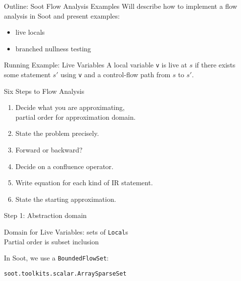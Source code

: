 \begin{slide}{Outline: Soot Flow Analysis Examples}
Will describe how to implement a flow analysis in Soot and present examples:
\begin{itemize}
\item live locals
\item branched nullness testing
\end{itemize}
\end{slide}

\begin{slide}{Running Example: Live Variables}
\vspace*{-0.2in} 
A local variable {\tt v} is {\red live} at $s$ if there exists some
statement $s'$ using {\tt v} and a control-flow path from $s$ to $s'$.

\quad

\begin{center}

\end{center}
\end{slide}

\begin{slide}{Six Steps to Flow Analysis}
\begin{enumerate}
\item Decide what you are approximating,\\ partial order for approximation domain.

\item State the problem precisely.

\item Forward or backward?

\item Decide on a confluence operator.

\item Write equation for each kind of IR statement.

\item State the starting approximation.
\end{enumerate}
\end{slide}

\begin{slide}{Step 1: Abstraction domain}
\vspace*{-0.2in}

Domain for Live Variables: sets of {\tt Local}s\\
Partial order is subset inclusion

\begin{center}
\scalebox{0.95}{
}
\mbox{\qquad }
\end{center}
\vspace*{-0.1in}

In Soot, we use a {\tt BoundedFlowSet}:
\begin{center}
{\tt soot.toolkits.scalar.ArraySparseSet} 
\end{center}
\end{slide}

